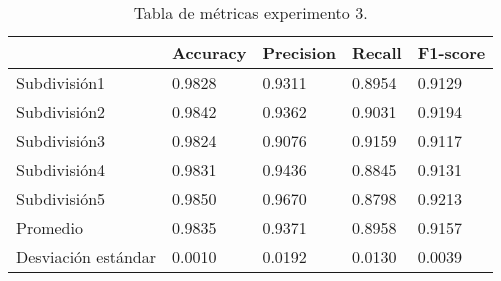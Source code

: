 \begin{table}[H]
\centering
\begin{tabular}{|l|llll|}
\hline
              & Accuracy &     Precision &     Recall  &   F1-score \\ \hline
              
Subdivisión1            &       0.9828  &       0.9311  &       0.8954  &       0.9129  \\ 
Subdivisión2            &       0.9842  &       0.9362  &       0.9031  &       0.9194  \\ 
Subdivisión3            &       0.9824  &       0.9076  &       0.9159  &       0.9117  \\ 
Subdivisión4            &       0.9831  &       0.9436  &       0.8845  &       0.9131  \\ 
Subdivisión5            &       0.9850  &       0.9670  &       0.8798  &       0.9213  \\ \hline
Promedio                &       0.9835  &       0.9371  &       0.8958  &       0.9157  \\ \hline
Desviación estándar     &       0.0010  &       0.0192  &       0.0130  &       0.0039  \\ \hline

\end{tabular}
\caption{Tabla de métricas experimento 3.}
		     \label{tab:exp3}
\end{table}